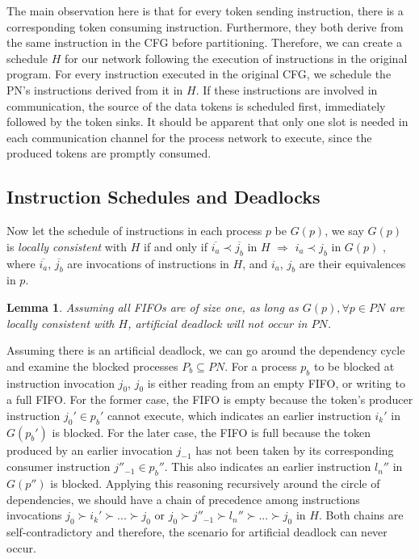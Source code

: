 \documentclass{sig-alternate}
\newtheorem{lemma}[theorem]{Lemma}
\begin{document}
The main observation here is that for every token sending instruction, there is a corresponding token consuming instruction. Furthermore, they both derive from the same instruction in the CFG before partitioning. Therefore, we can create a schedule $H$ for our network following the execution of instructions in the original program. For every instruction executed in the original CFG, we schedule the PN's instructions derived from it in $H$. If these instructions are involved in communication, the source of the data tokens is scheduled first, immediately followed by the token sinks. It should be apparent that only one slot is needed
in each communication channel for the process network to execute, since the produced tokens are promptly consumed.

\subsection{Instruction Schedules and Deadlocks}
Now let the schedule of instructions in each process $p$ be $G(p)$, we say $G(p)$ is \textit{locally consistent} with $H$ if and only if 
$\overline{i_a} \prec \overline{j_b}$ in $H$ $\Rightarrow$ $i_a \prec j_b$ in $G(p)$
, where $\overline{i_a}$, $\overline{j_b}$ are invocations of instructions in $H$, and $i_a$, $j_b$ are their equivalences in $p$. 
\begin{lemma}
\label{nondeadlock}
Assuming 
all FIFOs are of size one,
as long as $G(p), \forall p \in PN$ are locally consistent with $H$,
artificial deadlock will not occur in $PN$. 
\end{lemma}

Assuming there is an artificial deadlock, we can go around the dependency
cycle and examine the blocked processes $P_b \subseteq PN$. 
For a process $p_b$ to be blocked at instruction invocation $j_0$, $j_0$ is either reading from an empty FIFO, or writing to a full FIFO. 
For the former case, the FIFO is empty because the token's producer instruction $j_0' \in p_b'$ cannot execute, which indicates an earlier instruction  $i_k'$ in $G(p_b')$ is blocked. 
For the later case, the FIFO is full because the token produced by an earlier invocation $j_{-1}$ has not been taken by its corresponding consumer instruction $j''_{-1} \in p_b''$. 
This also indicates an earlier instruction $l_n''$ in $G(p'')$ is blocked. 
Applying this reasoning recursively around the circle of dependencies,
we should have a chain of precedence among instructions invocations $j_0 \succ i_k' \succ ... \succ j_0$
or $j_0 \succ j''_{-1} \succ l_n'' \succ ... \succ j_0$ in $H$. %
Both chains are self-contradictory and therefore, the scenario for artificial deadlock can never occur. 
\end{document}
